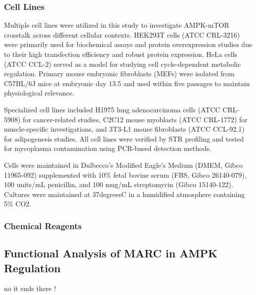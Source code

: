\documentclass[11pt,a4paper]{article}
\begin{document}
\subsubsection{Cell Lines}

Multiple cell lines were utilized in this study to investigate AMPK-mTOR crosstalk across different cellular contexts. HEK293T cells (ATCC CRL-3216) were primarily used for biochemical assays and protein overexpression studies due to their high transfection efficiency and robust protein expression. HeLa cells (ATCC CCL-2) served as a model for studying cell cycle-dependent metabolic regulation. Primary mouse embryonic fibroblasts (MEFs) were isolated from C57BL/6J mice at embryonic day 13.5 and used within five passages to maintain physiological relevance.

Specialized cell lines included H1975 lung adenocarcinoma cells (ATCC CRL-5908) for cancer-related studies, C2C12 mouse myoblasts (ATCC CRL-1772) for muscle-specific investigations, and 3T3-L1 mouse fibroblasts (ATCC CCL-92.1) for adipogenesis studies. All cell lines were verified by STR profiling and tested for mycoplasma contamination using PCR-based detection methods.

Cells were maintained in Dulbecco's Modified Eagle's Medium (DMEM, Gibco 11965-092) supplemented with 10\% fetal bovine serum (FBS, Gibco 26140-079), 100 units/mL penicillin, and 100 mug/mL streptomycin (Gibco 15140-122). Cultures were maintained at 37degreesC in a humidified atmosphere containing 5\% CO2.

\subsubsection{Chemical Reagents}

\subsection{Functional Analysis of MARC in AMPK Regulation}

no it ends there !
\end{document}
